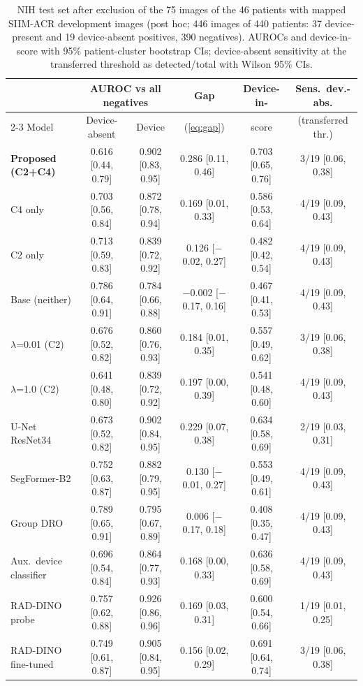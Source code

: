 \documentclass{ieeeaccess}
\newcommand{\ci}[2]{\scriptsize[#1, #2]}
\begin{document}
\begin{table}[!t]
\centering\small
\setlength{\tabcolsep}{3.5pt}
\caption{NIH test set after exclusion of the 75 images of the 46 patients with mapped SIIM-ACR development images (post hoc; 446 images of 440 patients: 37 device-present and 19 device-absent positives, 390 negatives). AUROCs and device-in-score with 95\% patient-cluster bootstrap CIs; device-absent sensitivity at the transferred threshold as detected/total with Wilson 95\% CIs.}
\label{tab:overlap}
\begin{tabular}{@{}l c c c c c@{}}
\toprule
 & \multicolumn{2}{c}{AUROC vs all negatives} & Gap & Device-in- & Sens.\ dev.-abs. \\
\cmidrule(lr){2-3}
Model & Device-absent & Device & (\cref{eq:gap}) & score & (transferred thr.) \\
\midrule
\rowcolor{band}\textbf{Proposed (C2+C4)} & 0.616 \ci{0.44}{0.79} & 0.902 \ci{0.83}{0.95} & 0.286 \ci{0.11}{0.46} & 0.703 \ci{0.65}{0.76} & 3/19 \ci{0.06}{0.38} \\
C4 only & 0.703 \ci{0.56}{0.84} & 0.872 \ci{0.78}{0.94} & 0.169 \ci{0.01}{0.33} & 0.586 \ci{0.53}{0.64} & 4/19 \ci{0.09}{0.43} \\
C2 only & 0.713 \ci{0.59}{0.83} & 0.839 \ci{0.72}{0.92} & 0.126 \ci{$-$0.02}{0.27} & 0.482 \ci{0.42}{0.54} & 4/19 \ci{0.09}{0.43} \\
Base (neither) & 0.786 \ci{0.64}{0.91} & 0.784 \ci{0.66}{0.88} & $-$0.002 \ci{$-$0.17}{0.16} & 0.467 \ci{0.41}{0.53} & 4/19 \ci{0.09}{0.43} \\
$\lambda$=0.01 (C2) & 0.676 \ci{0.52}{0.82} & 0.860 \ci{0.76}{0.93} & 0.184 \ci{0.01}{0.35} & 0.557 \ci{0.49}{0.62} & 3/19 \ci{0.06}{0.38} \\
$\lambda$=1.0 (C2) & 0.641 \ci{0.48}{0.80} & 0.839 \ci{0.72}{0.92} & 0.197 \ci{0.00}{0.39} & 0.541 \ci{0.48}{0.60} & 4/19 \ci{0.09}{0.43} \\
\midrule
U-Net ResNet34 & 0.673 \ci{0.52}{0.82} & 0.902 \ci{0.84}{0.95} & 0.229 \ci{0.07}{0.38} & 0.634 \ci{0.58}{0.69} & 2/19 \ci{0.03}{0.31} \\
SegFormer-B2 & 0.752 \ci{0.63}{0.87} & 0.882 \ci{0.79}{0.95} & 0.130 \ci{$-$0.01}{0.27} & 0.553 \ci{0.49}{0.61} & 4/19 \ci{0.09}{0.43} \\
Group DRO & 0.789 \ci{0.65}{0.91} & 0.795 \ci{0.67}{0.89} & 0.006 \ci{$-$0.17}{0.18} & 0.408 \ci{0.35}{0.47} & 4/19 \ci{0.09}{0.43} \\
Aux.\ device classifier & 0.696 \ci{0.54}{0.84} & 0.864 \ci{0.77}{0.93} & 0.168 \ci{0.00}{0.33} & 0.636 \ci{0.58}{0.69} & 4/19 \ci{0.09}{0.43} \\
RAD-DINO probe & 0.757 \ci{0.62}{0.88} & 0.926 \ci{0.86}{0.96} & 0.169 \ci{0.03}{0.31} & 0.600 \ci{0.54}{0.66} & 1/19 \ci{0.01}{0.25} \\
RAD-DINO fine-tuned & 0.749 \ci{0.61}{0.87} & 0.905 \ci{0.84}{0.95} & 0.156 \ci{0.02}{0.29} & 0.691 \ci{0.64}{0.74} & 3/19 \ci{0.06}{0.38} \\
\bottomrule
\end{tabular}
\end{table}
\end{document}
